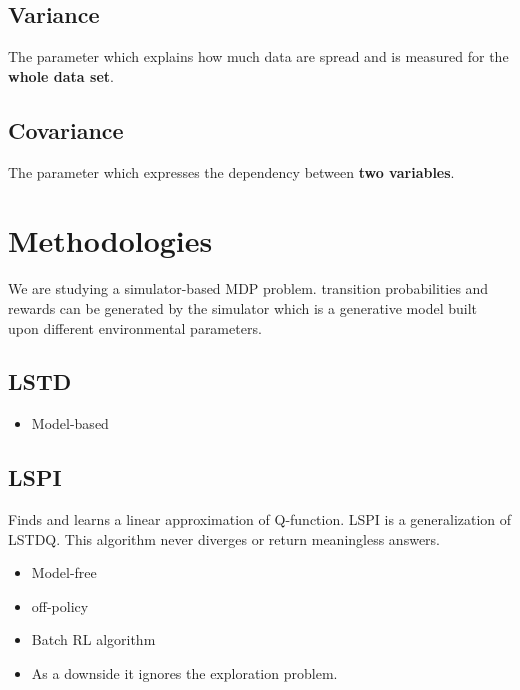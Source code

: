 \documentclass[letterpaper,12pt]{article}
\begin{document}
    \subsection{Variance}
    The parameter which explains how much data are spread and is measured for the \textbf{whole data set}.

    \subsection{Covariance}
    The parameter which expresses the dependency between \textbf{two variables}.

    \section{Methodologies}
    We are studying a simulator-based MDP problem. transition probabilities and rewards can be generated by the simulator which is a generative model built upon different environmental parameters.

    \subsection{LSTD}
    \begin{itemize}
        \item Model-based \cite{Boyan1998}
    \end{itemize}

    \subsection{LSPI}
    Finds and learns a linear approximation of Q-function. LSPI is a generalization of LSTDQ. This algorithm never diverges or return meaningless answers.

    \begin{itemize}
        \item Model-free \cite{Lagoudakis2003}
        \item off-policy
        \item Batch RL algorithm
        \item As a downside it ignores the exploration problem.
    \end{itemize}
\end{document}
